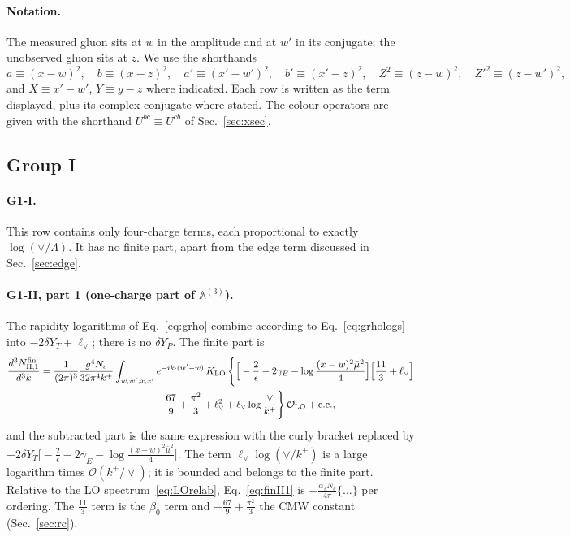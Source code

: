 \documentclass[aps,prd,onecolumn,superscriptaddress,nofootinbib,floatfix,longbibliography,11pt]{revtex4-2}
\numberwithin{equation}{section}
\def\mf#1{\mathbb{#1}}
\newcommand{\lV}{\ell_{\vee}}
\newcommand{\Ord}{\mathcal{O}}
\begin{document}
\paragraph*{Notation.} The measured gluon sits at $w$ in the amplitude and at $w'$ in its conjugate; the unobserved gluon sits at $z$. We use the shorthands
\begin{equation}
a\equiv(x-w)^2,\quad b\equiv(x-z)^2,\quad a'\equiv(x'-w')^2,\quad b'\equiv(x'-z)^2,\quad Z^2\equiv(z-w)^2,\quad Z'^2\equiv(z-w')^2,
\end{equation}
and $X\equiv x'-w'$, $Y\equiv y-z$ where indicated. Each row is written as the term displayed, plus its complex conjugate where stated. The colour operators are given with the shorthand $U^{bc}\equiv U^{cb}$ of Sec.~\ref{sec:xsec}.

\subsection{Group I}\label{sec:finiteG1}

\paragraph*{G1-I.} This row contains only four-charge terms, each proportional to exactly $\log(\vee/\Lambda)$. It has no finite part, apart from the edge term discussed in Sec.~\ref{sec:edge}.

\paragraph*{G1-II, part 1 (one-charge part of $\mf A^{(3)}$).} The rapidity logarithms of Eq.~\eqref{eq:grho} combine according to Eq.~\eqref{eq:grhologs} into $-2\delta Y_T+\lV$; there is no $\delta Y_P$. The finite part is
\begin{align}
\frac{d^3N^{\rm fin}_{\rm II,1}}{d^3k}={}&\frac{1}{(2\pi)^3}\frac{g^4N_c}{32\pi^4k^+}\int_{w,w',x,x'}e^{-ik\cdot(w'-w)}\,K_{\rm LO}\,\Bigg\{\Big[-\frac2\epsilon-2\gamma_E-\log\frac{(x-w)^2\bar\mu^2}{4}\Big]\Big[\frac{11}{3}+\lV\Big]\notag\\
&\hspace{10em}-\frac{67}{9}+\frac{\pi^2}{3}+\lV^2+\lV\log\frac{\vee}{k^+}\Bigg\}\,\Ord_{\rm LO}+{\rm c.c.},
\label{eq:finII1}
\end{align}
and the subtracted part is the same expression with the curly bracket replaced by $-2\delta Y_T\big[-\frac2\epsilon-2\gamma_E-\log\frac{(x-w)^2\bar\mu^2}{4}\big]$. The term $\lV\log(\vee/k^+)$ is a large logarithm times $\Ord(k^+/\vee)$; it is bounded and belongs to the finite part. Relative to the LO spectrum~\eqref{eq:LOrelab}, Eq.~\eqref{eq:finII1} is $-\frac{\alpha_sN_c}{4\pi}\{\dots\}$ per ordering. The $\frac{11}{3}$ term is the $\beta_0$ term and $-\frac{67}{9}+\frac{\pi^2}{3}$ the CMW constant (Sec.~\ref{sec:rc}).
\end{document}

